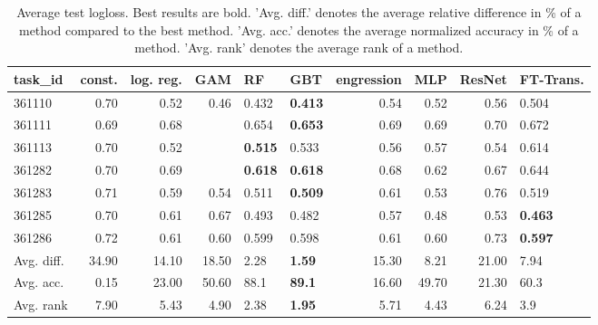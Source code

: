 \begin{table}[ht!]
\centering
\begingroup\footnotesize
\begin{tabular}{lrrrllrrrl}
  \hline
\hline
task\_id & const. & log. reg. & GAM & RF & GBT & engression & MLP & ResNet & FT-Trans. \\ 
  \hline
361110 & 0.70 & 0.52 & 0.46 & 0.432 & \textbf{0.413} & 0.54 & 0.52 & 0.56 & 0.504 \\ 
  361111 & 0.69 & 0.68 &  & 0.654 & \textbf{0.653} & 0.69 & 0.69 & 0.70 & 0.672 \\ 
  361113 & 0.70 & 0.52 &  & \textbf{0.515} & 0.533 & 0.56 & 0.57 & 0.54 & 0.614 \\ 
  361282 & 0.70 & 0.69 &  & \textbf{0.618} & \textbf{0.618} & 0.68 & 0.62 & 0.67 & 0.644 \\ 
  361283 & 0.71 & 0.59 & 0.54 & 0.511 & \textbf{0.509} & 0.61 & 0.53 & 0.76 & 0.519 \\ 
  361285 & 0.70 & 0.61 & 0.67 & 0.493 & 0.482 & 0.57 & 0.48 & 0.53 & \textbf{0.463} \\ 
  361286 & 0.72 & 0.61 & 0.60 & 0.599 & 0.598 & 0.61 & 0.60 & 0.73 & \textbf{0.597} \\ 
   \hline
Avg. diff. & 34.90 & 14.10 & 18.50 & 2.28 & \textbf{1.59} & 15.30 & 8.21 & 21.00 & 7.94 \\ 
  Avg. acc. & 0.15 & 23.00 & 50.60 & 88.1 & \textbf{89.1} & 16.60 & 49.70 & 21.30 & 60.3 \\ 
  Avg. rank & 7.90 & 5.43 & 4.90 & 2.38 & \textbf{1.95} & 5.71 & 4.43 & 6.24 & 3.9 \\ 
   \hline
\hline
\end{tabular}
\endgroup
\caption{Average test logloss. 
                  Best results are bold. 
                  'Avg. diff.' denotes the average relative difference in \% of a method compared to the best method.
                  'Avg. acc.' denotes the average normalized accuracy in \% of a method.
                  'Avg. rank' denotes the average rank of a method.} 
\label{TABLES/table_results_logloss_num_and_cat_features}
\end{table}
